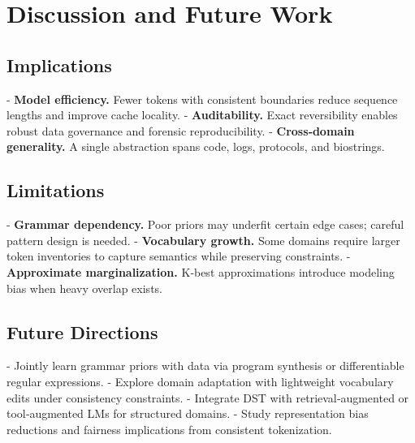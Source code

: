 \section{Discussion and Future Work}
\label{sec:discussion}

\subsection{Implications}

- \textbf{Model efficiency.} Fewer tokens with consistent boundaries reduce sequence lengths and improve cache locality.
- \textbf{Auditability.} Exact reversibility enables robust data governance and forensic reproducibility.
- \textbf{Cross‑domain generality.} A single abstraction spans code, logs, protocols, and biostrings.

\subsection{Limitations}

- \textbf{Grammar dependency.} Poor priors may underfit certain edge cases; careful pattern design is needed.
- \textbf{Vocabulary growth.} Some domains require larger token inventories to capture semantics while preserving constraints.
- \textbf{Approximate marginalization.} K‑best approximations introduce modeling bias when heavy overlap exists.

\subsection{Future Directions}

- Jointly learn grammar priors with data via program synthesis or differentiable regular expressions.
- Explore domain adaptation with lightweight vocabulary edits under consistency constraints.
- Integrate DST with retrieval‑augmented or tool‑augmented LMs for structured domains.
- Study representation bias reductions and fairness implications from consistent tokenization.
